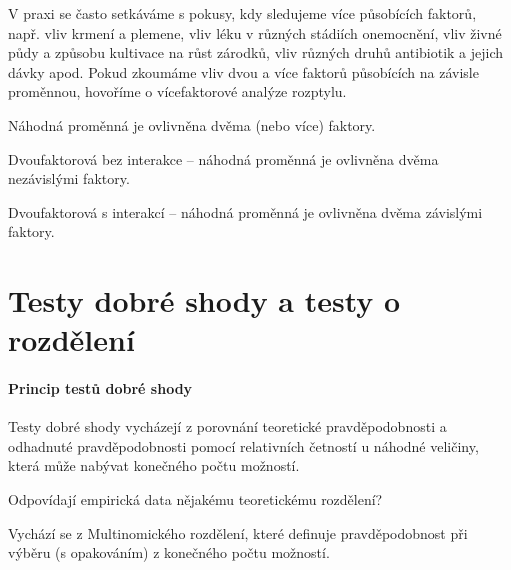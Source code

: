 \begin{compactitem}
    \item V praxi se často setkáváme s pokusy, kdy sledujeme více působících faktorů, např. vliv krmení a plemene, vliv léku v různých stádiích onemocnění, vliv živné půdy a způsobu kultivace na růst zárodků, vliv různých druhů antibiotik a jejich dávky apod. Pokud zkoumáme vliv dvou a více faktorů působících na závisle proměnnou, hovoříme o vícefaktorové analýze rozptylu.

    \item Náhodná proměnná je ovlivněna dvěma (nebo více) faktory.

    \item Dvoufaktorová bez interakce -- náhodná proměnná je ovlivněna dvěma nezávislými faktory.

    \item Dvoufaktorová s interakcí -- náhodná proměnná je ovlivněna dvěma závislými faktory.
\end{compactitem}


\section{Testy dobré shody a testy o rozdělení}

\paragraph*{Princip testů dobré shody}

\begin{compactitem}
    \item Testy dobré shody vycházejí z porovnání teoretické pravděpodobnosti a odhadnuté pravděpodobnosti pomocí relativních četností u náhodné veličiny, která může nabývat
    konečného počtu možností. \begin{compactitem}
        \item Odpovídají empirická data nějakému teoretickému rozdělení?
    \end{compactitem}

    \item Vychází se z Multinomického rozdělení, které definuje pravděpodobnost při výběru (s opakováním) z konečného počtu možností.
\end{compactitem}

